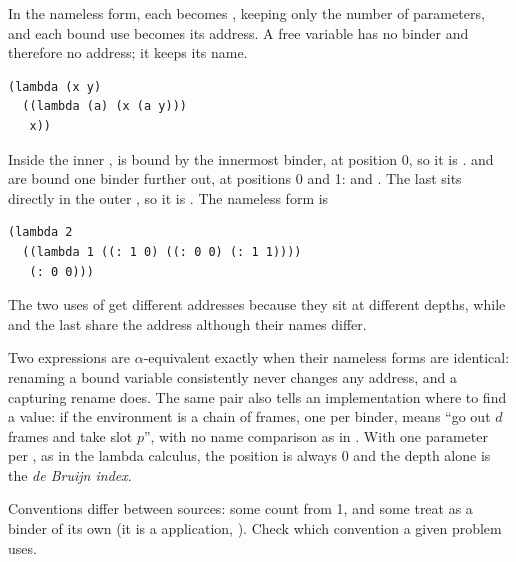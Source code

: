 In the nameless form, each  becomes , keeping only the number of parameters, and each bound use becomes its address. A free variable has no binder and therefore no address; it keeps its name.

\begin{example}
\begin{lstlisting}
(lambda (x y)
  ((lambda (a) (x (a y)))
   x))
\end{lstlisting}
Inside the inner ,  is bound by the innermost binder, at position 0, so it is .  and  are bound one binder further out, at positions 0 and 1:  and . The last  sits directly in the outer , so it is . The nameless form is
\begin{lstlisting}
(lambda 2
  ((lambda 1 ((: 1 0) ((: 0 0) (: 1 1))))
   (: 0 0)))
\end{lstlisting}
The two uses of  get different addresses because they sit at different depths, while  and the last  share the address  although their names differ.
\end{example}

\begin{keypoint}
Two expressions are $\alpha$-equivalent exactly when their nameless forms are identical: renaming a bound variable consistently never changes any address, and a capturing rename does. The same pair also tells an implementation where to find a value: if the environment is a chain of frames, one per binder,  means ``go out $d$ frames and take slot $p$'', with no name comparison as in . With one parameter per , as in the lambda calculus, the position is always 0 and the depth alone is the \emph{de Bruijn index}.
\end{keypoint}

\begin{remark}
Conventions differ between sources: some count from 1, and some treat  as a binder of its own (it is a  application, ). Check which convention a given problem uses.
\end{remark}

